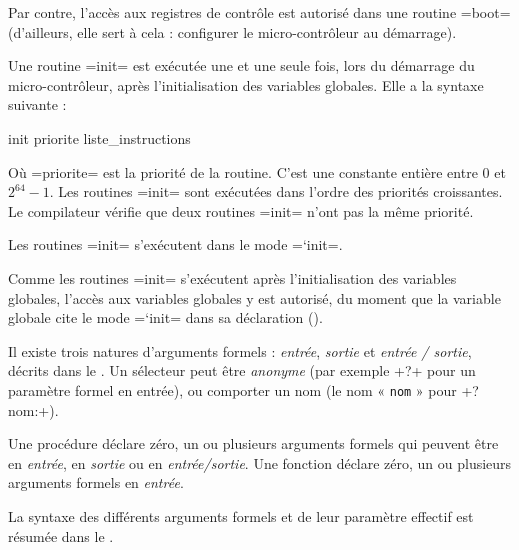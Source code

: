 Par contre, l'accès aux registres de contrôle est autorisé dans une routine \plm=boot= (d'ailleurs, elle sert à cela : configurer le micro-contrôleur au démarrage).








Une routine \plm=init= est exécutée une et une seule fois, lors du démarrage du micro-contrôleur, après l'initialisation des variables globales. Elle a la syntaxe suivante :
\begin{PLM}
init priorite {
  liste_instructions
}
\end{PLM}
Où \plm=priorite= est la priorité de la routine. C'est une constante entière entre $0$ et $2^{64}-1$. Les routines \plm=init= sont exécutées dans l'ordre des priorités croissantes. Le compilateur vérifie que deux routines \plm=init= n'ont pas la même priorité.

Les routines \plm=init= s'exécutent dans le mode \plm=`init=.

Comme les routines \plm=init= s'exécutent après l'initialisation des variables globales, l'accès aux variables globales y est autorisé, du moment que la variable globale cite le mode \plm=`init= dans sa déclaration ().







Il existe trois natures d'arguments formels : \emph{entrée}, \emph{sortie} et \emph{entrée / sortie}, décrits dans le . Un sélecteur peut être \emph{anonyme} (par exemple \plm+?+ pour un paramètre formel en entrée), ou comporter un nom (le nom « \texttt{nom} » pour \plm+?nom:+).

Une procédure déclare zéro, un ou plusieurs arguments formels qui peuvent être en \emph{entrée}, en \emph{sortie} ou en \emph{entrée/sortie}. Une fonction déclare zéro, un ou plusieurs arguments formels en \emph{entrée}.

La syntaxe des différents arguments formels et de leur paramètre effectif est résumée dans le . 

